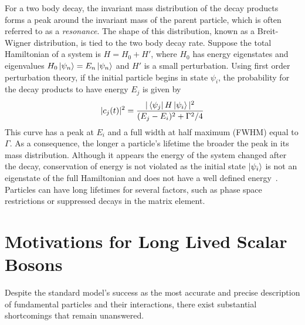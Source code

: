 For a two body decay, the invariant mass distribution of the decay products forms a peak around the invariant mass of the parent particle, which is often referred to as a \textit{resonance}. The shape of this distribution, known as a Breit-Wigner distribution, is tied to the two body decay rate. Suppose the total Hamiltonian of a system is $H=H_0+H'$, where $H_0$ has energy eigenstates and eigenvalues $H_0\ket{\psi_n}=E_n\ket{\psi_n}$ and $H'$ is a small perturbation. Using first order perturbation theory, if the initial particle begins in state $\psi_i$, the probability for the decay products to have energy $E_j$ is given by
\begin{equation}
	|c_j(t)|^2=\frac{|\bra{\psi_j}H\ket{\psi_i}|^2}{(E_j-E_i)^2+\Gamma^2/4}
\end{equation}
This curve has a peak at $E_i$ and a full width at half maximum (FWHM) equal to $\Gamma$. As a consequence, the longer a particle's lifetime the broader the peak in its mass distribution. Although it appears the energy of the system changed after the decay, conservation of energy is not violated as the initial state $\ket{\psi_i}$ is not an eigenstate of the full Hamiltonian and does not have a well defined energy~\cite{breigtwigner}. Particles can have long lifetimes for several factors, such as phase space restrictions or suppressed decays in the matrix element.

\section{Motivations for Long Lived Scalar Bosons} \label{sec:BSM}
Despite the standard model's success as the most accurate and precise description of fundamental particles and their interactions, there exist substantial shortcomings that remain unanswered. 